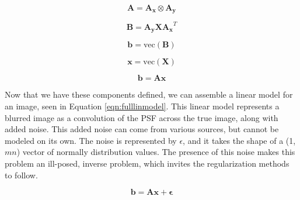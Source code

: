 \documentclass[letterpaper, 11pt, titlepage, twocolumn]{article}
\begin{document}
\begin{equation}
  \label{eqn:kron}
  \mathbf{A} = \mathbf{A_x} \otimes \mathbf{A_y}
\end{equation}

\begin{equation}
  \label{eqn:kronvec}
  \mathbf{B} = \mathbf{A_y}\mathbf{X}\mathbf{A_x}^T
\end{equation}

\begin{equation*}
  \mathbf{b} = \textrm{vec}(\mathbf{B})
\end{equation*}

\begin{equation*}
  \mathbf{x} = \textrm{vec}(\mathbf{X})
\end{equation*}

\begin{equation}
  \label{eqn:linmodel}
  \mathbf{b} = \mathbf{A}\mathbf{x}
\end{equation}

Now that we have these components defined, we can assemble a linear model for an image, seen in Equation \eqref{eqn:fulllinmodel}. This linear model represents a blurred image as a convolution of the PSF across the true image, along with added noise. This added noise can come from various sources, but cannot be modeled on its own. The noise is represented by $\epsilon$, and it takes the shape of a (1, $mn$) vector of normally distribution values. The presence of this noise makes this problem an ill-posed, inverse problem, which invites the regularization methods to follow. 

\begin{equation}
  \label{eqn:fulllinmodel}
  \mathbf{b} = \mathbf{A}\mathbf{x} + \mathbf{\epsilon}
\end{equation}
\end{document}
